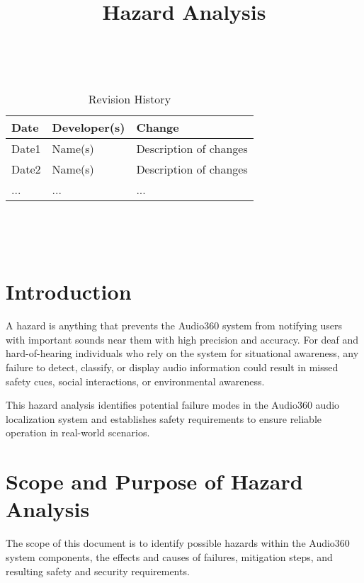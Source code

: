 \documentclass{article}
\title{Hazard Analysis\\\progname}
\author{\authname}
\date{}
\begin{document}
\maketitle
\thispagestyle{empty}

~\newpage


\begin{table}[hp]
\caption{Revision History} \label{TblRevisionHistory}
\begin{tabularx}{\textwidth}{llX}
\toprule
\textbf{Date} & \textbf{Developer(s)} & \textbf{Change}\\
\midrule
Date1 & Name(s) & Description of changes\\
Date2 & Name(s) & Description of changes\\
... & ... & ...\\
\bottomrule
\end{tabularx}
\end{table}

~\newpage

\tableofcontents

~\newpage



\section{Introduction}

A hazard is anything that prevents the Audio360 system from notifying users with important sounds near them with high precision and accuracy. For deaf and hard-of-hearing individuals who rely on the system for situational awareness, any failure to detect, classify, or display audio information could result in missed safety cues, social interactions, or environmental awareness.

This hazard analysis identifies potential failure modes in the Audio360 audio localization system and establishes safety requirements to ensure reliable operation in real-world scenarios.

\section{Scope and Purpose of Hazard Analysis}

The scope of this document is to identify possible hazards within the Audio360 system components, the effects and causes of failures, mitigation steps, and resulting safety and security requirements.
\end{document}
